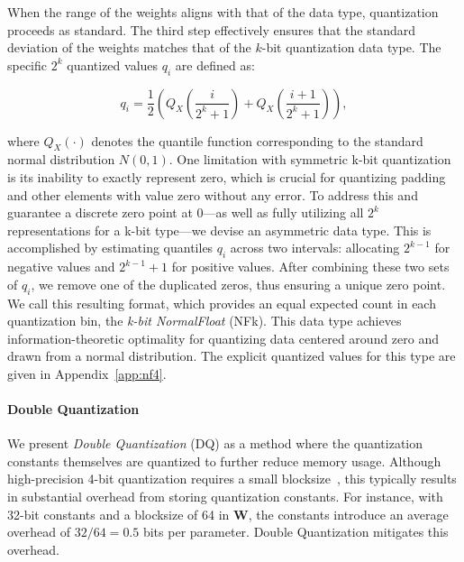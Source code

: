 When the range of the weights aligns with that of the data type, quantization proceeds as standard. The third step effectively ensures that the standard deviation of the weights matches that of the $k$-bit quantization data type. The specific $2^k$ quantized values $q_i$ are defined as:

\begin{equation}
q_i  = \frac{1}{2}\left( Q_X\left(\frac{i}{2^k+1}\right) + Q_X\left(\frac{i+1}{2^k+1}\right)\right),
\end{equation}

where $Q_X(\cdot)$ denotes the quantile function corresponding to the standard normal distribution $N(0,1)$. One limitation with symmetric k-bit quantization is its inability to exactly represent zero, which is crucial for quantizing padding and other elements with value zero without any error. To address this and guarantee a discrete zero point at $0$—as well as fully utilizing all $2^k$ representations for a k-bit type—we devise an asymmetric data type. This is accomplished by estimating quantiles $q_i$ across two intervals: allocating $2^{k-1}$ for negative values and $2^{k-1}+1$ for positive values. After combining these two sets of $q_i$, we remove one of the duplicated zeros, thus ensuring a unique zero point. We call this resulting format, which provides an equal expected count in each quantization bin, the \emph{k-bit NormalFloat} (NFk). This data type achieves information-theoretic optimality for quantizing data centered around zero and drawn from a normal distribution. The explicit quantized values for this type are given in Appendix~\ref{app:nf4}.

\paragraph{Double Quantization{}} 
We present \emph{Double Quantization} (DQ) as a method where the quantization constants themselves are quantized to further reduce memory usage. Although high-precision 4-bit quantization requires a small blocksize~\citep{dettmers2022case}, this typically results in substantial overhead from storing quantization constants. For instance, with 32-bit constants and a blocksize of 64 in $\mathbf{W}$, the constants introduce an average overhead of $32/64 = 0.5$ bits per parameter. Double Quantization mitigates this overhead.

